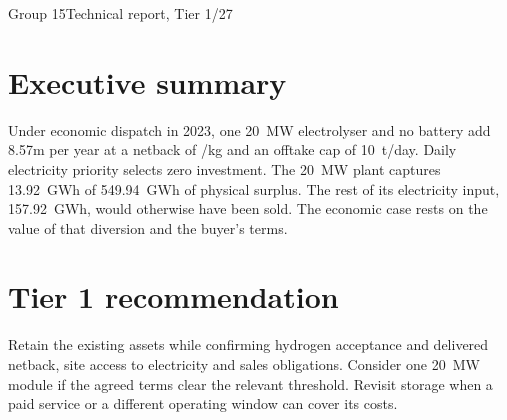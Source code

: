 \documentclass[11pt,a4paper]{article}
\begin{document}
  {Group 15\quad\textbar\quad Technical report, Tier 1\quad\textbar{}/27}

\section*{Executive summary}
Under economic dispatch in 2023, one 20~MW electrolyser and no battery
add \gbp 8.57m per year at a netback of /kg and an offtake cap
of 10~t/day. Daily electricity priority selects zero investment. The
20~MW plant captures 13.92~GWh of 549.94~GWh of physical surplus.
The rest of its electricity input, 157.92~GWh, would otherwise have
been sold. The economic case rests on the value of that diversion and
the buyer's terms.



\section{Tier 1 recommendation}
Retain the existing assets while confirming hydrogen acceptance and
delivered netback, site access to electricity and sales obligations.
Consider one 20~MW module if the agreed terms clear the relevant threshold.
Revisit storage when a paid service or a different operating window can
cover its costs.


\end{document}
